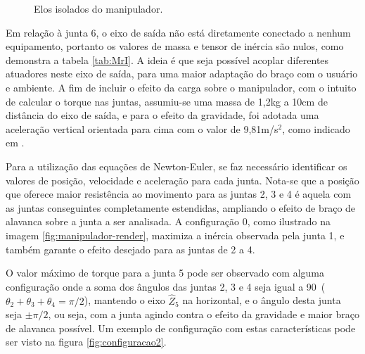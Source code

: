 \begin{figure}[h]
\begin{centering}
\begin{floatrow}
    \end{floatrow}


\caption{Elos isolados do manipulador.}
\label{fig:elos}

\par\end{centering}
\end{figure}

Em relação à junta 6, o eixo de saída não está diretamente conectado a nenhum equipamento, 
portanto os valores de massa e tensor de inércia são nulos, como demonstra a tabela
\ref{tab:MrI}. A ideia é que seja possível acoplar diferentes atuadores neste eixo de
saída, para uma maior adaptação do braço com o usuário e ambiente. A fim de incluir o 
efeito da carga sobre o manipulador, com o intuito de calcular o torque nas juntas, 
assumiu-se uma massa de 1,2kg a 10cm de distância do eixo de saída, e para o efeito
da gravidade, foi adotada uma aceleração vertical orientada para cima com o valor
de 9,81m/s$^2$, como indicado em \cite{craig2009introduction}.

Para a utilização das equações de Newton-Euler, se faz necessário identificar os
valores de posição, velocidade e aceleração para cada junta. Nota-se que a posição que
oferece maior resistência ao movimento para as juntas 2, 3 e 4 é aquela com as juntas 
conseguintes completamente estendidas, ampliando o efeito de braço de alavanca sobre a 
junta a ser analisada. A configuração 0, como ilustrado na imagem \ref{fig:manipulador-render}, 
maximiza a inércia observada pela junta 1, e também garante o efeito desejado para as 
juntas de 2 a 4.

O valor máximo de torque para a junta 5 pode ser observado com alguma configuração onde
a soma dos ângulos das juntas 2, 3 e 4 seja igual a 90\textdegree \, ($\theta_2+\theta_3+\theta_4=\pi/2$),
mantendo o eixo $\hat{Z}_5$ na horizontal, e o ângulo desta junta seja $\pm \pi/2$, ou seja, 
com a junta agindo contra o efeito da gravidade e maior braço de alavanca possível. Um exemplo de
configuração com estas características pode ser visto na figura \ref{fig:configuracao2}.

